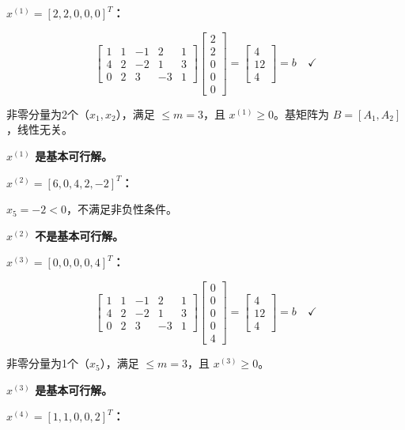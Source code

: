 \documentclass[12pt,a4paper]{article}
\begin{document}
\textbf{$x^{(1)} = [2, 2, 0, 0, 0]^T$：}


\[
\left[\begin{array}{ccccc}
1 & 1 & -1 & 2 & 1 \\
4 & 2 & -2 & 1 & 3 \\
0 & 2 & 3 & -3 & 1
\end{array}\right]
\left[\begin{array}{c}
2 \\ 2 \\ 0 \\ 0 \\ 0
\end{array}\right]
=
\left[\begin{array}{c}
4 \\ 12 \\ 4
\end{array}\right] = b \quad \checkmark
\]

非零分量为2个（$x_1, x_2$），满足 $\leq m=3$，且 $x^{(1)} \geq 0$。基矩阵为 $B = [A_1, A_2]$，线性无关。


\textbf{$x^{(1)}$ 是基本可行解。}

\textbf{$x^{(2)} = [6, 0, 4, 2, -2]^T$：}

$x_5 = -2 < 0$，不满足非负性条件。

\textbf{$x^{(2)}$ 不是基本可行解。}

\textbf{$x^{(3)} = [0, 0, 0, 0, 4]^T$：}


\[
\left[\begin{array}{ccccc}
1 & 1 & -1 & 2 & 1 \\
4 & 2 & -2 & 1 & 3 \\
0 & 2 & 3 & -3 & 1
\end{array}\right]
\left[\begin{array}{c}
0 \\ 0 \\ 0 \\ 0 \\ 4
\end{array}\right]
=
\left[\begin{array}{c}
4 \\ 12 \\ 4
\end{array}\right] = b \quad \checkmark
\]

非零分量为1个（$x_5$），满足 $\leq m=3$，且 $x^{(3)} \geq 0$。

\textbf{$x^{(3)}$ 是基本可行解。}

\textbf{$x^{(4)} = [1, 1, 0, 0, 2]^T$：}
\end{document}
